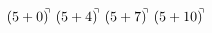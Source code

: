 \documentclass[preview]{standalone}
\begin{document}
\begin{align*}
(5+0)^{\hspace{-0.1cm}\urcorner} \ (5+4)^{\hspace{-0.1cm}\urcorner} \ (5+7)^{\hspace{-0.1cm}\urcorner} \ (5+10)^{\hspace{-0.1cm}\urcorner}
\end{align*}
\end{document}
